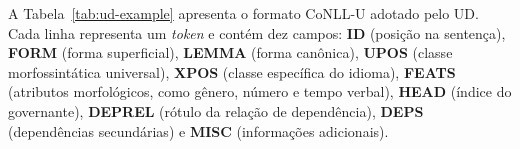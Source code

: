 A Tabela~\ref{tab:ud-example} apresenta o formato CoNLL-U adotado pelo UD. Cada linha
representa um \textit{token} e contém dez campos: \textbf{ID} (posição na sentença),
\textbf{FORM} (forma superficial), \textbf{LEMMA} (forma canônica), \textbf{UPOS} (classe
morfossintática universal), \textbf{XPOS} (classe específica do idioma), \textbf{FEATS}
(atributos morfológicos, como gênero, número e tempo verbal), \textbf{HEAD} (índice do
governante), \textbf{DEPREL} (rótulo da relação de dependência), \textbf{DEPS} (dependências
secundárias) e \textbf{MISC} (informações adicionais).

\begin{table}[h]
\centering
{}
\end{table}
